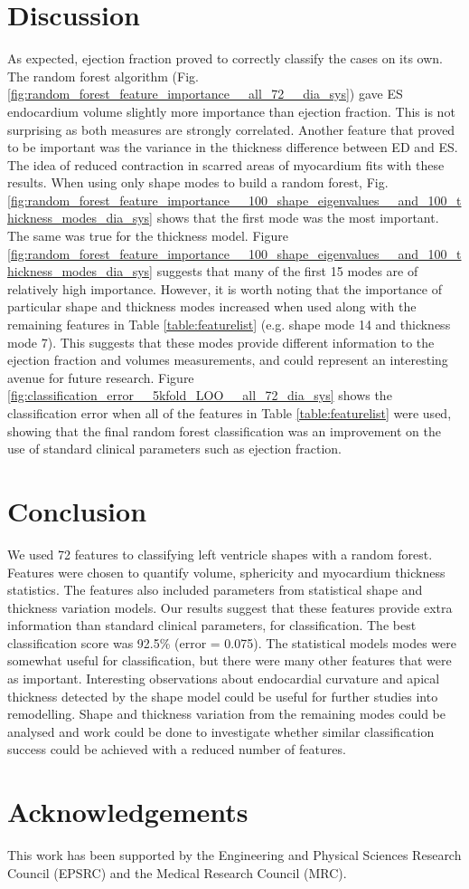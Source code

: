\documentclass{llncs}
\begin{document}
\section{Discussion}
As expected, ejection fraction proved to correctly classify the cases on its own. The random forest algorithm (Fig. \ref{fig:random_forest_feature_importance__all_72__dia_sys}) gave ES endocardium volume slightly more importance than ejection fraction. This is not surprising as both measures are strongly correlated. Another feature that proved to be important was the variance in the thickness difference between ED and ES. The idea of reduced contraction in scarred areas of myocardium fits with these results.
When using only shape modes to build a random forest, Fig.     \ref{fig:random_forest_feature_importance__100_shape_eigenvalues__and_100_thickness_modes_dia_sys} shows that the first mode was the most important. The same was true for the thickness model. Figure \ref{fig:random_forest_feature_importance__100_shape_eigenvalues__and_100_thickness_modes_dia_sys} suggests that many of the first 15 modes are of relatively high importance. However, it is worth noting that the importance of particular shape and thickness modes increased when used along with the remaining features in Table \ref{table:featurelist} (e.g. shape mode 14 and thickness mode 7). This suggests that these modes provide different information to the ejection fraction and volumes measurements, and could represent an interesting avenue for future research.
Figure \ref{fig:classification_error__5kfold_LOO__all_72_dia_sys} shows the classification error when all of the features in Table \ref{table:featurelist} were used, showing that the final random forest classification was an improvement on the use of standard clinical parameters such as ejection fraction.
\section{Conclusion}
We used 72 features to classifying left ventricle shapes with a random forest. Features were chosen to quantify volume, sphericity and myocardium thickness statistics. The features also included parameters from statistical shape and thickness variation models. Our results suggest that these features provide extra information than standard clinical parameters, for classification. The best classification score was 92.5\% (error = 0.075). 
The statistical models modes were somewhat useful for classification, but there were many other features that were as important. Interesting observations about endocardial curvature and apical thickness detected by the shape model could be useful for further studies into remodelling. Shape and thickness variation from the remaining modes could be analysed and work could be done to investigate whether similar classification success could be achieved with a reduced number of features.
\section{Acknowledgements}
This work has been supported by the Engineering and Physical Sciences Research Council (EPSRC) and the Medical Research Council (MRC).


\end{document}
